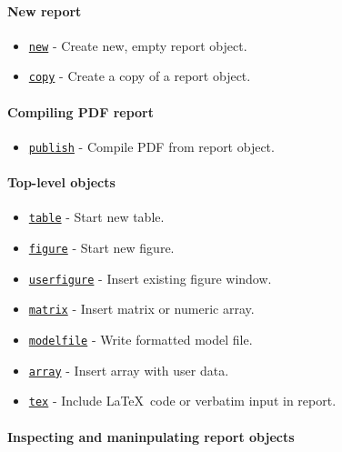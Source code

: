 

	\paragraph{New report}
 
 \begin{itemize}
 \item
   \href{report/new}{\texttt{new}} - Create new, empty report object.
 \item
   \href{report/copy}{\texttt{copy}} - Create a copy of a report object.
 \end{itemize}
 
 \paragraph{Compiling PDF report}
 
 \begin{itemize}
 \item
   \href{report/publish}{\texttt{publish}} - Compile PDF from report
   object.
 \end{itemize}
 
 \paragraph{Top-level objects}
 
 \begin{itemize}
 \item
   \href{report/table}{\texttt{table}} - Start new table.
 \item
   \href{report/figure}{\texttt{figure}} - Start new figure.
 \item
   \href{report/userfigure}{\texttt{userfigure}} - Insert existing figure
   window.
 \item
   \href{report/matrix}{\texttt{matrix}} - Insert matrix or numeric
   array.
 \item
   \href{report/modelfile}{\texttt{modelfile}} - Write formatted model
   file.
 \item
   \href{report/array}{\texttt{array}} - Insert array with user data.
 \item
   \href{report/tex}{\texttt{tex}} - Include \LaTeX~code or verbatim
   input in report.
 \end{itemize}
 
 \paragraph{Inspecting and maninpulating report objects}
 
